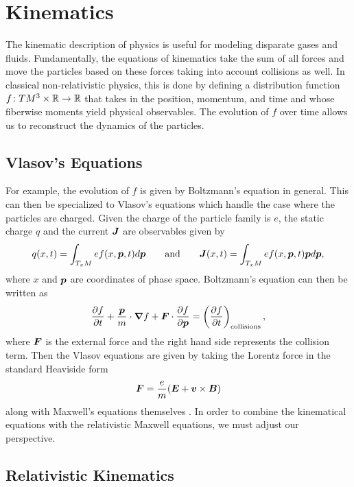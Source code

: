 \documentclass[conf]{new-aiaa}
\begin{document}
\section{Kinematics}

The kinematic description of physics is useful for modeling disparate gases and fluids. Fundamentally, the equations of kinematics take the sum of all forces and move the particles based on these forces taking into account collisions as well. In classical non-relativistic physics, this is done by defining a distribution function $f\colon TM^3 \times \mathbb{R} \to \mathbb{R}$ that takes in the position, momentum, and time and whose fiberwise moments yield physical observables. The evolution of $f$ over time allows us to reconstruct the dynamics of the particles.

\subsection{Vlasov's Equations}
For example, the evolution of $f$ is given by Boltzmann's equation in general. This can then be specialized to Vlasov's equations which handle the case where the particles are charged. Given the charge of the particle family is $e$, the static charge $q$ and the current $\boldsymbol{J}$ are observables given by
\begin{equation}
    q(x,t) = \int_{T_xM} e f(x,\boldsymbol{p},t)d\boldsymbol{p} \qquad \textrm{and} \qquad  \boldsymbol{J}(x,t) =  \int_{T_xM} ef(x,\boldsymbol{p},t)\boldsymbol{p}d\boldsymbol{p},
\end{equation}
where $x$ and $\boldsymbol{p}$ are coordinates of phase space. Boltzmann's equation can then be written as
\begin{equation}
\frac{\partial f}{\partial t} + \frac{\boldsymbol{p}}{m} \cdot \boldsymbol{\nabla} f + \boldsymbol{F} \cdot \frac{\partial f}{\partial \boldsymbol{p}} = \left( \frac{\partial f}{\partial t}\right)_{\textrm{collisions}},
\end{equation}
where $\boldsymbol{F}$ is the external force and the right hand side represents the collision term. Then the Vlasov equations are given by taking the Lorentz force in the standard Heaviside form 
\begin{equation}
\boldsymbol{F} = \frac{e}{m}(\boldsymbol{E}+\boldsymbol{v}\times \boldsymbol{B})
\end{equation}
along with Maxwell's equations themselves \cite{manning_analysis_2009}. In order to combine the kinematical equations with the relativistic Maxwell equations, we must adjust our perspective.

\subsection{Relativistic Kinematics}
\end{document}

